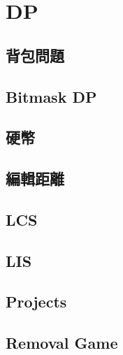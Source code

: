 \section{DP}
\subsection{背包問題} 

\subsection{Bitmask DP} 

\subsection{硬幣} 

\subsection{編輯距離} 

\subsection{LCS} 

\subsection{LIS} 

\subsection{Projects} 

\subsection{Removal Game} 
